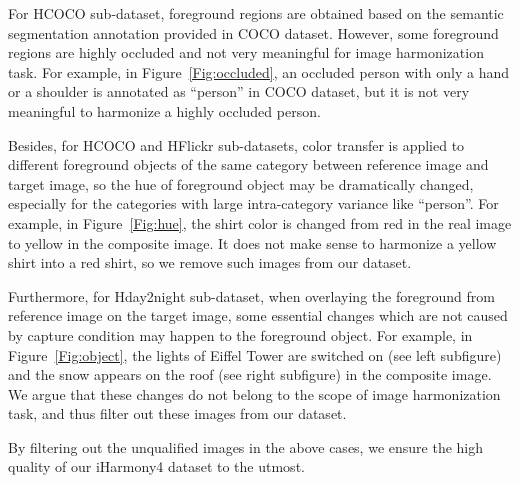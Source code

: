 \documentclass[10pt,twocolumn,letterpaper]{article}
\begin{document}
For HCOCO sub-dataset, foreground regions are obtained based on the semantic segmentation annotation provided in COCO dataset. However, some foreground regions are highly occluded and not very meaningful for image harmonization task. For example, in Figure~\ref{Fig:occluded}, an occluded person with only a hand or a shoulder is annotated as ``person'' in COCO dataset, but it is not very meaningful to harmonize a highly occluded person.

Besides, for HCOCO and HFlickr sub-datasets, color transfer is applied to different foreground objects of the same category between reference image and target image, so the hue of foreground object may be dramatically changed, especially for the categories with large intra-category variance like ``person''. For example, in Figure~\ref{Fig:hue}, the shirt color is changed from red in the real image to yellow in the composite image. It does not make sense to harmonize a yellow shirt into a red shirt, so we remove such images from our dataset.

Furthermore, for Hday2night sub-dataset, when overlaying the foreground from reference image on the target image, some essential changes which are not caused by capture condition may happen to the foreground object. For example, in Figure~\ref{Fig:object}, the lights of Eiffel Tower are switched on (see left subfigure) and the snow appears on the roof (see right subfigure) in the composite image. We argue that these changes do not belong to the scope of image harmonization task, and thus filter out these images from our dataset.

By filtering out the unqualified images in the above cases, we ensure the high quality of our iHarmony4 dataset to the utmost.
\end{document}
